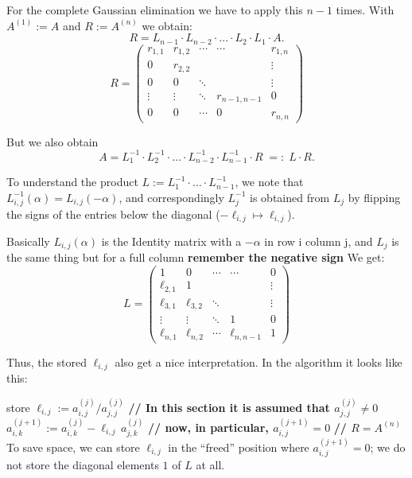 \documentclass{article}
\begin{document}
For the complete Gaussian elimination we have to apply this $n-1$ times. With $A^{(1)} := A$ and $R := A^{(n)}$ we obtain:
\begin{equation}
  R = L_{n-1}\cdot L_{n-2}\cdot \dots \cdot L_2 \cdot L_1 \cdot A. 
\end{equation}
\[
  R =
  \begin{pmatrix}
    r_{1,1} & r_{1,2} & \cdots & \cdots & r_{1,n} \\
    0 & r_{2,2} &        & & \vdots \\
    0 & 0 & \ddots & & \vdots \\
    \vdots & \vdots & \ddots & r_{n-1,n-1} & 0 \\
    0 & 0 & \cdots & 0 & r_{n,n}
  \end{pmatrix}
\]

But we also obtain
\begin{equation}
  A = L_1^{-1}\cdot L_2^{-1}\cdot \dots \cdot L_{n-2}^{-1}\cdot L_{n-1}^{-1}\cdot R
  \;=:\; L \cdot R.
\end{equation}

To understand the product $L := L_1^{-1}\cdot \dots \cdot L_{n-1}^{-1}$, we note that
$L_{i,j}^{-1}(\alpha) = L_{i,j}(-\alpha)$, and correspondingly $L_j^{-1}$ is obtained from $L_j$ by flipping the signs of the entries below the diagonal ($-\ell_{i,j} \mapsto \ell_{i,j}$).

Basically $L_{i,j}(\alpha)$ is the Identity matrix with a $-\alpha$ in row i column j, and $L_j$ is the same thing but for a full column \textbf{remember the negative sign}
We get:
\[
  L =
  \begin{pmatrix}
    1 & 0 & \cdots & \cdots & 0 \\
    \ell_{2,1} & 1 &        & & \vdots \\
    \ell_{3,1} & \ell_{3,2} & \ddots & & \vdots \\
    \vdots & \vdots & \ddots & 1 & 0 \\
    \ell_{n,1} & \ell_{n,2} & \cdots & \ell_{n,n-1} & 1
  \end{pmatrix}
\]

Thus, the stored $\ell_{i,j}$ also get a nice interpretation. In the algorithm it looks like this:

\begin{algorithm}[H]
\caption{LR decomposition -- compute for $A \in \mathbb{K}^{n\times n}$ an upper triangular matrix $R$ and a lower triangular matrix $L$ with diagonal elements $1$, such that $A = L\cdot R$}
\begin{algorithmic}[1]
    \State store $\ell_{i,j} := a^{(j)}_{i,j} / a^{(j)}_{j,j}$
    \State \textbf{// In this section it is assumed that $a^{(j)}_{j,j} \ne 0$}
      \State $a^{(j+1)}_{i,k} := a^{(j)}_{i,k} - \ell_{i,j}\,a^{(j)}_{j,k}$
    \EndFor
    \State \textbf{// now, in particular, $a^{(j+1)}_{i,j} = 0$}
  \EndFor
\EndFor
\State \textbf{// $R = A^{(n)}$}
\State To save space, we can store $\ell_{i,j}$ in the ``freed'' position where $a^{(j+1)}_{i,j} = 0$; we do not store the diagonal elements $1$ of $L$ at all.
\end{algorithmic}
\end{algorithm}
\end{document}

